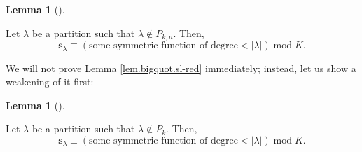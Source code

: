 \documentclass[numbers=enddot,12pt,final,onecolumn,notitlepage]{scrartcl}%
\theoremstyle{definition}
\newtheorem{lem}[theo]{Lemma}
\newenvironment{lemma}[1][]
{\begin{lem}[#1]\begin{leftbar}}
{\end{leftbar}\end{lem}}
\begin{document}
\begin{lemma}
\label{lem.bigquot.sl-red}Let $\lambda$ be a partition such that
$\lambda\notin P_{k,n}$. Then,%
\[
\mathbf{s}_{\lambda}\equiv\left(  \text{some symmetric function of degree
}<\left\vert \lambda\right\vert \right)  \operatorname{mod}K.
\]

\end{lemma}

We will not prove Lemma \ref{lem.bigquot.sl-red} immediately; instead, let us
show a weakening of it first:

\begin{lemma}
\label{lem.bigquot.sl-red-1}Let $\lambda$ be a partition such that
$\lambda\notin P_{k}$. Then,%
\[
\mathbf{s}_{\lambda}\equiv\left(  \text{some symmetric function of degree
}<\left\vert \lambda\right\vert \right)  \operatorname{mod}K.
\]

\end{lemma}
\end{document}
